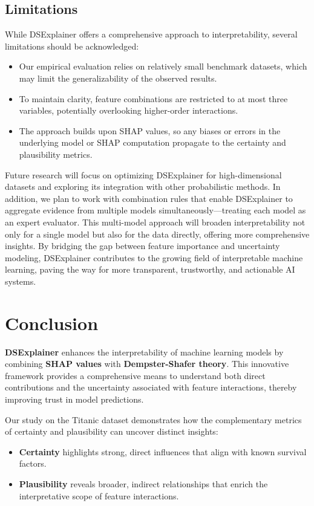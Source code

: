 \documentclass[acmlarge]{acmart}
\begin{document}
\subsection{Limitations}
While DSExplainer offers a comprehensive approach to interpretability, several limitations should be acknowledged:
\begin{itemize}
    \item Our empirical evaluation relies on relatively small benchmark datasets, which may limit the generalizability of the observed results.
    \item To maintain clarity, feature combinations are restricted to at most three variables, potentially overlooking higher-order interactions.
    \item The approach builds upon SHAP values, so any biases or errors in the underlying model or SHAP computation propagate to the certainty and plausibility metrics.
\end{itemize}

Future research will focus on optimizing DSExplainer for high-dimensional datasets and exploring its integration with other probabilistic methods. In addition, we plan to work with combination rules that enable DSExplainer to aggregate evidence from multiple models simultaneously—treating each model as an expert evaluator. This multi-model approach will broaden interpretability not only for a single model but also for the data directly, offering more comprehensive insights. By bridging the gap between feature importance and uncertainty modeling, DSExplainer contributes to the growing field of interpretable machine learning, paving the way for more transparent, trustworthy, and actionable AI systems.

\section{Conclusion}
\label{sec:conclusion}

\textbf{DSExplainer} enhances the interpretability of machine learning models by combining \textbf{SHAP values} with \textbf{Dempster-Shafer theory}. This innovative framework provides a comprehensive means to understand both direct contributions and the uncertainty associated with feature interactions, thereby improving trust in model predictions.

Our study on the Titanic dataset demonstrates how the complementary metrics of certainty and plausibility can uncover distinct insights:
\begin{itemize}
    \item \textbf{Certainty} highlights strong, direct influences that align with known survival factors.
    \item \textbf{Plausibility} reveals broader, indirect relationships that enrich the interpretative scope of feature interactions.
\end{itemize}
\end{document}
